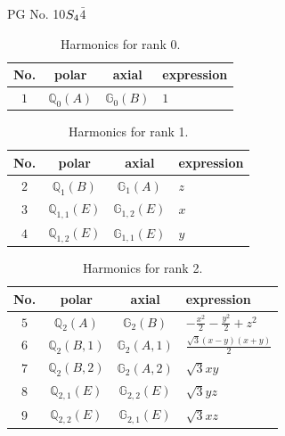 \documentclass[fleqn,8pt,landscape]{jsarticle}
\begin{document}
\setcounter{MaxMatrixCols}{32}

\renewcommand{\tablename}{Table~}
\renewcommand{\figurename}{Figure~}
\begin{center}
\LARGE
PG No. 10\quad$S_{\rm 4}$\quad$\bar{4}$\quad[ tetragonal ]
\end{center}
\begin{table}[ht!]
\begin{center}
\caption{Harmonics for rank 0.}
\renewcommand{\arraystretch}{1.3}
\begin{tabular}{cccl} \hline \hline
No. & polar & axial & expression \\ \hline
$ 1 $ & $ \mathbb{Q}_{0}(A) $ & $ \mathbb{G}_{0}(B) $ & $ 1 $ \\
 \hline \hline
\end{tabular}
\end{center}
\end{table}
\begin{table}[ht!]
\begin{center}
\caption{Harmonics for rank 1.}
\renewcommand{\arraystretch}{1.3}
\begin{tabular}{cccl} \hline \hline
No. & polar & axial & expression \\ \hline
$ 2 $ & $ \mathbb{Q}_{1}(B) $ & $ \mathbb{G}_{1}(A) $ & $ z $ \\
$ 3 $ & $ \mathbb{Q}_{1,1}(E) $ & $ \mathbb{G}_{1,2}(E) $ & $ x $ \\
$ 4 $ & $ \mathbb{Q}_{1,2}(E) $ & $ \mathbb{G}_{1,1}(E) $ & $ y $ \\
 \hline \hline
\end{tabular}
\end{center}
\end{table}
\begin{table}[ht!]
\begin{center}
\caption{Harmonics for rank 2.}
\renewcommand{\arraystretch}{1.3}
\begin{tabular}{cccl} \hline \hline
No. & polar & axial & expression \\ \hline
$ 5 $ & $ \mathbb{Q}_{2}(A) $ & $ \mathbb{G}_{2}(B) $ & $ - \frac{x^{2}}{2} - \frac{y^{2}}{2} + z^{2} $ \\
$ 6 $ & $ \mathbb{Q}_{2}(B,1) $ & $ \mathbb{G}_{2}(A,1) $ & $ \frac{\sqrt{3} \left(x - y\right) \left(x + y\right)}{2} $ \\
$ 7 $ & $ \mathbb{Q}_{2}(B,2) $ & $ \mathbb{G}_{2}(A,2) $ & $ \sqrt{3} x y $ \\
$ 8 $ & $ \mathbb{Q}_{2,1}(E) $ & $ \mathbb{G}_{2,2}(E) $ & $ \sqrt{3} y z $ \\
$ 9 $ & $ \mathbb{Q}_{2,2}(E) $ & $ \mathbb{G}_{2,1}(E) $ & $ \sqrt{3} x z $ \\
 \hline \hline
\end{tabular}
\end{center}
\end{table}
\end{document}

